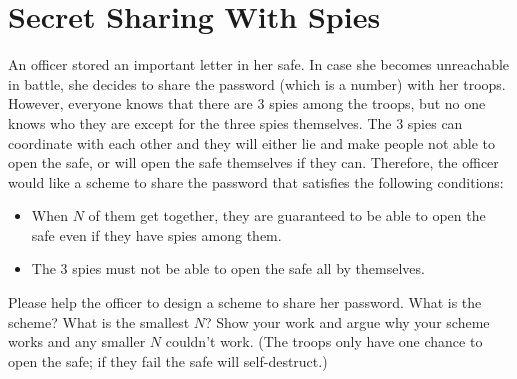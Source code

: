 \documentclass{article}
\begin{document}
\newpage

\section{Secret Sharing With Spies}
\begin{hw}
	An officer stored an important letter in her safe. In case she becomes unreachable in battle, she decides to share the password (which is a number)
	with her troops. However, everyone knows that there are 3 spies among
	the troops, but no one knows who they are except for the three spies
	themselves. The 3 spies can coordinate with each other and they will
	either lie and make people not able to open the safe, or will open the
	safe themselves if they can. Therefore, the officer would like a
	scheme to share the password that satisfies the following conditions:
	\begin{itemize}
		\item When $N$ of them get together, they are guaranteed to be
		able to open the safe even if they have spies among them.
		\item The 3 spies must not be able to open the safe all by themselves.
	\end{itemize}
	
	Please help the officer to design a scheme to share her password. What
	is the scheme? What is the smallest $N$? Show your work and argue why
	your scheme works and any smaller $N$ couldn't work. (The troops only 
	have one chance to open the safe; if they fail the safe will 
	self-destruct.)
\end{hw}
\end{document}
